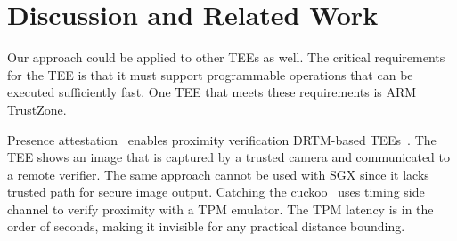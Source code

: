 
\section{Discussion and Related Work}
\label{sec:discussion}

{} Our approach could be applied to other TEEs as well. The critical requirements for the TEE is that it must support programmable operations that can be executed sufficiently fast. One TEE that meets these requirements is ARM TrustZone. %


\vspace{-2pt}
Presence attestation~\cite{presenceAttestation} enables proximity verification DRTM-based TEEs~\cite{mccune2008flicker}. The TEE shows an image that is captured by a trusted camera and communicated to a remote verifier. The same approach cannot be used with SGX since it lacks trusted path for secure image output. Catching the cuckoo~\cite{CatchingCuckoo} uses timing side channel to verify proximity with a TPM emulator. The TPM latency is in the order of seconds, making it invisible for any practical distance bounding. 
